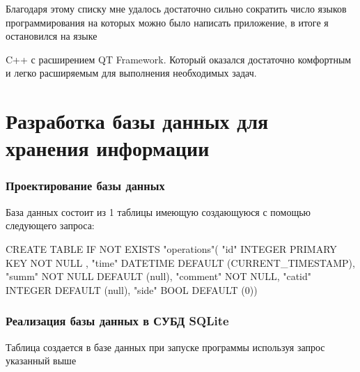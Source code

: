 Благодаря этому списку мне удалось достаточно сильно сократить число
языков программирования на которых можно было написать приложение, в
итоге я остановился на языке

C++ с расширением QT Framework. Который оказался достаточно комфортным и легко расширяемым для выполнения необходимых задач.

\part{Разработка базы данных для хранения информации}
\section{Проектирование базы данных}
База данных состоит из 1 таблицы имеющую создающуюся с помощью следующего запроса:
\begin{MyCode}
	CREATE TABLE  IF NOT EXISTS "operations"(
	"id" INTEGER  PRIMARY KEY  NOT NULL ,
	"time" DATETIME DEFAULT (CURRENT_TIMESTAMP),
	"summ" NOT NULL  DEFAULT (null),
	"comment"  NOT NULL,
	"catid" INTEGER DEFAULT (null),
	"side" BOOL DEFAULT (0))
\end{MyCode}

\section{Реализация базы данных в СУБД SQLite}
Таблица создается в базе данных при запуске программы используя запрос указанный выше\\
